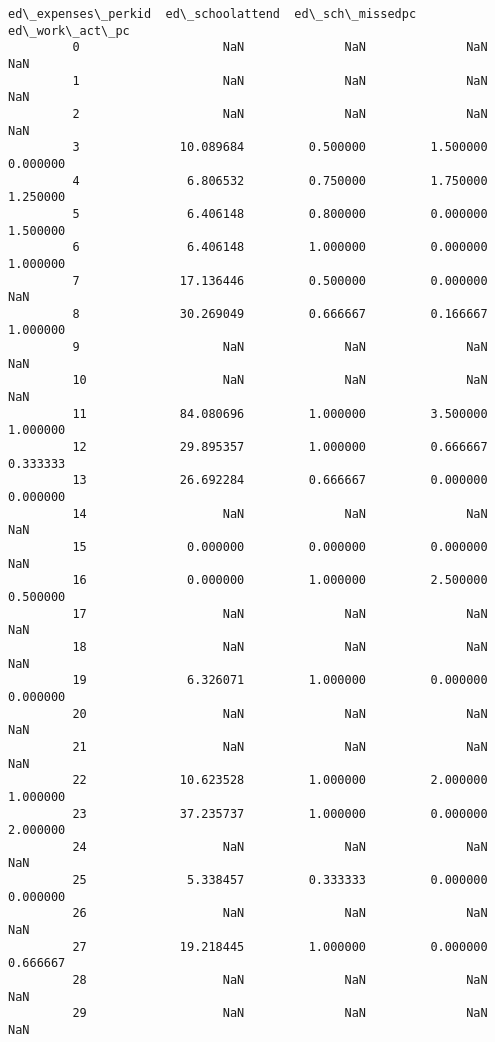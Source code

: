 \documentclass[11pt]{article}
\begin{document}
\begin{Verbatim}[commandchars=\\\{\}]
               ed\_expenses\_perkid  ed\_schoolattend  ed\_sch\_missedpc  ed\_work\_act\_pc  
         0                    NaN              NaN              NaN             NaN  
         1                    NaN              NaN              NaN             NaN  
         2                    NaN              NaN              NaN             NaN  
         3              10.089684         0.500000         1.500000        0.000000  
         4               6.806532         0.750000         1.750000        1.250000  
         5               6.406148         0.800000         0.000000        1.500000  
         6               6.406148         1.000000         0.000000        1.000000  
         7              17.136446         0.500000         0.000000             NaN  
         8              30.269049         0.666667         0.166667        1.000000  
         9                    NaN              NaN              NaN             NaN  
         10                   NaN              NaN              NaN             NaN  
         11             84.080696         1.000000         3.500000        1.000000  
         12             29.895357         1.000000         0.666667        0.333333  
         13             26.692284         0.666667         0.000000        0.000000  
         14                   NaN              NaN              NaN             NaN  
         15              0.000000         0.000000         0.000000             NaN  
         16              0.000000         1.000000         2.500000        0.500000  
         17                   NaN              NaN              NaN             NaN  
         18                   NaN              NaN              NaN             NaN  
         19              6.326071         1.000000         0.000000        0.000000  
         20                   NaN              NaN              NaN             NaN  
         21                   NaN              NaN              NaN             NaN  
         22             10.623528         1.000000         2.000000        1.000000  
         23             37.235737         1.000000         0.000000        2.000000  
         24                   NaN              NaN              NaN             NaN  
         25              5.338457         0.333333         0.000000        0.000000  
         26                   NaN              NaN              NaN             NaN  
         27             19.218445         1.000000         0.000000        0.666667  
         28                   NaN              NaN              NaN             NaN  
         29                   NaN              NaN              NaN             NaN  

\end{Verbatim}
\end{document}
